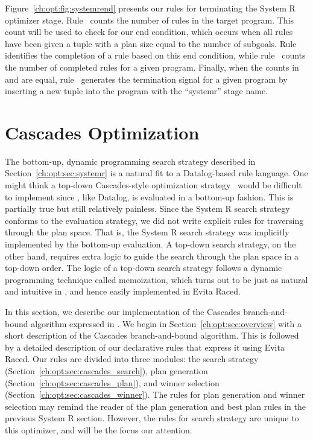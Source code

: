 Figure~\ref{ch:opt:fig:systemrend} presents our rules for terminating the
System R optimizer stage.  Rule~ counts the number of rules in the target
program.  This count will be used to check for our end condition, which occurs
when all rules have been given a  tuple with a plan size equal to
the number of subgoals.  Rule~ identifies the completion of a rule based
on this end condition, while rule~ counts the number of completed rules
for a given program.  Finally, when the counts in  and
 are equal, rule~ generates the termination signal for a given
program by inserting a new tuple into the  program with the ``systemr''
stage name.

\section{Cascades Optimization}
\label{ch:opt:sec:cascades}

The bottom-up, dynamic programming search strategy described in
Section~\ref{ch:opt:sec:systemr} is a natural fit to a Datalog-based rule
language.  One might think a top-down Cascades-style optimization
strategy~\cite{cascades} would be difficult to implement since \OVERLOG, like
Datalog, is evaluated in a bottom-up fashion.  This is partially true but still
relatively painless.  Since the System R search strategy conforms to the
\OVERLOG evaluation strategy, we did not write explicit rules for traversing
through the plan space.  That is, the System R search strategy was implicitly
implemented by the \OVERLOG bottom-up evaluation.  A top-down search strategy,
on the other hand, requires extra logic to guide the search through the plan
space in a top-down order.  The logic of a top-down search strategy follows a
dynamic programming technique called memoization, which turns out to be just as
natural and intuitive in \OVERLOG, and hence easily implemented in Evita Raced.

In this section, we describe our implementation of the Cascades
branch-and-bound algorithm expressed in \OVERLOG.  We begin in
Section~\ref{ch:opt:sec:overview} with a short description of the Cascades
branch-and-bound algorithm.  This is followed by a detailed description of our
declarative rules that express it using Evita Raced.  Our rules are divided
into three modules: the search strategy
(Section~\ref{ch:opt:sec:cascades_search}), plan generation
(Section~\ref{ch:opt:sec:cascades_plan}), and winner selection
(Section~\ref{ch:opt:sec:cascades_winner}).  The rules for plan generation and
winner selection may remind the reader of the plan generation and best plan
rules in the previous System R section.  However, the rules for search strategy
are unique to this optimizer, and will be the focus our attention.

